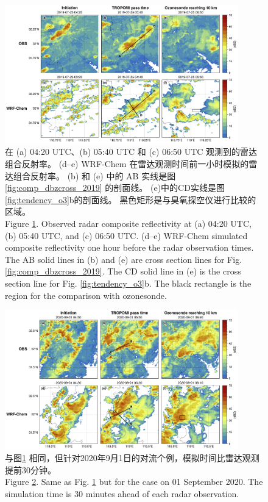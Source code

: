 \begin{figure}[htbp]
\centering
\includegraphics[width=0.9\textwidth]{./figures/comp_crf_2019.png}
\caption{在 (a) 04:20 UTC、(b) 05:40 UTC 和 (c) 06:50 UTC 观测到的雷达组合反射率。
         (d--e) WRF-Chem 在雷达观测时间前一小时模拟的雷达组合反射率。
         (b) 和 (e) 中的 AB 实线是图 \ref{fig:comp_dbzcross_2019} 的剖面线。
         (e)中的CD实线是图\ref{fig:tendency_o3}b的剖面线。
         黑色矩形是与臭氧探空仪进行比较的区域。\\
         Figure \ref{fig:comp_crf_2019}. Observed radar composite reflectivity at (a) 04:20 UTC, (b) 05:40 UTC, and (c) 06:50 UTC.
        (d--e) WRF-Chem simulated composite reflectivity one hour before the radar observation times.
        The AB solid lines in (b) and (e) are cross section lines for Fig. \ref{fig:comp_dbzcross_2019}.
        The CD solid line in (e) is the cross section line for Fig. \ref{fig:tendency_o3}b.
        The black rectangle is the region for the comparison with ozonesonde.}
\label{fig:comp_crf_2019}
\end{figure}

\begin{figure}[htbp]
\centering
\includegraphics[width=0.9\textwidth]{./figures/comp_crf_2020.png}
\caption{与图\ref{fig:comp_crf_2019} 相同，但针对2020年9月1日的对流个例，模拟时间比雷达观测提前30分钟。\\
Figure \ref{fig:comp_crf_2020}. Same as Fig. \ref{fig:comp_crf_2019} but for the case on 01 September 2020.
The simulation time is 30 minutes ahead of each radar observation.}
\label{fig:comp_crf_2020}
\end{figure}

